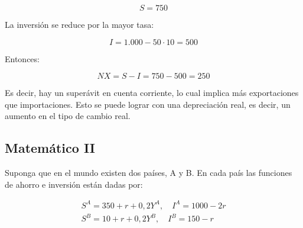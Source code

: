 \documentclass[a4paper]{article}
\begin{document}
\begin{itemize}
\begin{solution}
        \[
        S = 750
        \]

        La inversión se reduce por la mayor tasa:

        \[
        I = 1.000 - 50 \cdot 10 = 500
        \]

        Entonces:

        \[
        NX = S - I = 750 - 500 = 250
        \]

        Es decir, hay un superávit en cuenta corriente, lo cual implica más exportaciones que importaciones. Esto se puede lograr con una depreciación real, es decir, un aumento en el tipo de cambio real.
    \end{solution}
\end{itemize}






\subsection{Matemático II}
Suponga que en el mundo existen dos países, A y B. En cada país las funciones de ahorro e inversión están dadas por:

\begin{align*}
    S^A = 350 + r + 0{,}2Y^A , \quad I^A = 1000 - 2r  \\
    S^B = 10 + r + 0{,}2Y^B, \quad I^B = 150 - r 
\end{align*}
\end{document}
